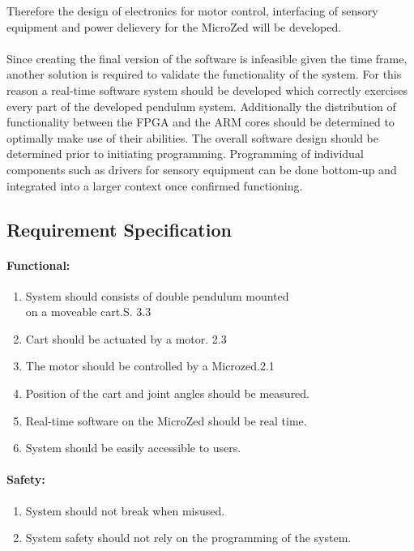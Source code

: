 Therefore the design of electronics for motor control, interfacing of sensory equipment and power delievery for the MicroZed will be developed. 
\\~\\
Since creating the final version of the software is infeasible given the time frame, another solution is required to validate the functionality of the system.
For this reason a real-time software system should be developed which correctly exercises every part of the developed pendulum system.
Additionally the distribution of functionality between the FPGA and the ARM cores should be determined to optimally make use of their abilities.
The overall software design should be determined prior to initiating programming.
Programming of individual components such as drivers for sensory equipment can be done bottom-up and integrated into a larger context once confirmed functioning.
\subsection{Requirement Specification}
\label{sub:requirements}

\paragraph{Functional:}
\begin{enumerate}	
	\item System should consists of double pendulum mounted\\ on a moveable cart.\hfill S. 3.3
	\item Cart should be actuated by a motor. \hfill 2.3
	\item The motor should be controlled by a Microzed.\hfill 2.1
	\item Position of the cart and joint angles should be measured.
	\item Real-time software on the MicroZed should be real time.
	\item System should be easily accessible to users.
\end{enumerate}

\paragraph{Safety:}
\begin{enumerate}[resume]
	\item System should not break when misused.
	\item System safety should not rely on the programming of the system.
\end{enumerate}


